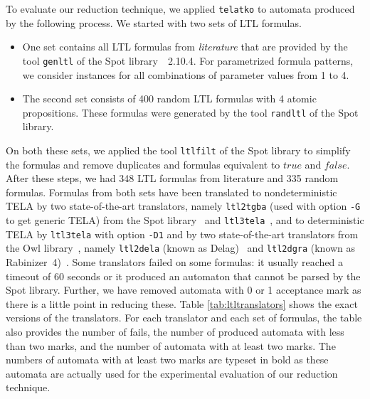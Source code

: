 \documentclass[a4paper,UKenglish,cleveref,autoref,thm-restate]{lipics-v2021}
\def\false{\mathit{false}}
\def\true{\mathit{true}}
\newcommand{\telatko}{\texttt{telatko}\xspace}
\begin{document}
To evaluate our reduction technique, we applied \telatko to automata
produced by the following process. We started with two sets of LTL formulas.
\begin{itemize}
\item One set contains all LTL formulas from \emph{literature} that
  are provided by the tool \texttt{genltl} of the Spot
  library~\cite{duret.16.atva2}~2.10.4. For parametrized formula
  patterns, we consider instances for all combinations of parameter
  values from 1 to 4.
\item The second set consists of 400 random LTL formulas with 4 atomic
  propositions. These formulas were generated by the tool
  \texttt{randltl} of the Spot library.
\end{itemize}
On both these sets, we applied the tool \texttt{ltlfilt} of the Spot
library to simplify the formulas and remove duplicates and formulas
equivalent to $\true$ and $\false$. After these steps, we had 348
LTL formulas from literature and 335 random formulas.
%
Formulas from both sets have been translated to nondeterministic TELA
by two state-of-the-art translators, namely \texttt{ltl2tgba} (used
with option \texttt{-G} to get generic TELA) from the Spot
library~\cite{duret.16.atva2} and
\texttt{ltl3tela}~\cite{major.19.atva}, and to deterministic TELA by
\texttt{ltl3tela} with option \texttt{-D1} and by two state-of-the-art
translators from the Owl library~\cite{kretinsky.18.atva}, namely
\texttt{ltl2dela} (known as Delag)~\cite{muller.17.gandalf} and
\texttt{ltl2dgra} (known as Rabinizer~4)~\cite{kretinsky.18.cav}. Some
translators failed on some formulas: it usually reached a timeout of
60 seconds or it produced an automaton that cannot be parsed by the
Spot library.
Further, we have removed automata with 0 or 1 acceptance mark as there
is a little point in reducing these. Table \ref{tab:ltltranslators}
shows the exact versions of the translators. For each translator and
each set of formulas, the table also provides the number of fails, the
number of produced automata with less than two marks, and the number
of automata with at least two marks. The numbers of automata with at
least two marks are typeset in bold as these automata are actually
used for the experimental evaluation of our reduction technique.
\end{document}
